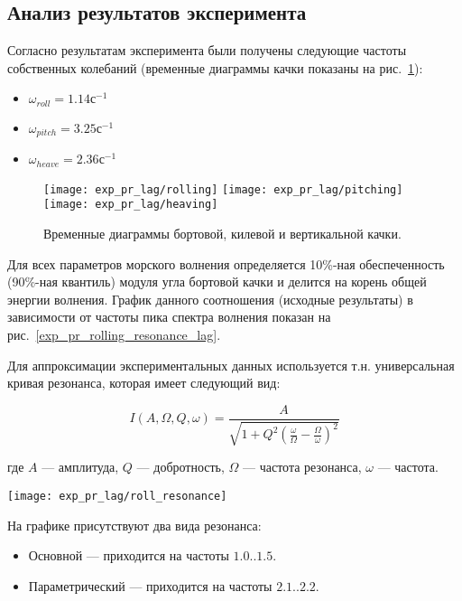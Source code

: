 \subsection{Анализ результатов эксперимента}

Согласно результатам эксперимента были получены следующие частоты собственных колебаний (временные диаграммы качки показаны на рис.~\ref{exp_pr_rolling_lag}):
\begin{itemize}
	\item	$ \omega_{roll} = 1.14 \text{с}^{-1}$
	\item	$ \omega_{pitch} = 3.25 \text{с}^{-1}$
	\item	$ \omega_{heave} = 2.36 \text{с}^{-1}$
\end{itemize}

\begin{figure}[ht]
	\begin{center}
	\texttt{[image: exp\_pr\_lag/rolling]}
	\texttt{[image: exp\_pr\_lag/pitching]}
	\texttt{[image: exp\_pr\_lag/heaving]}
	\end{center}
	\caption{Временные диаграммы бортовой, килевой и вертикальной качки.}
	\label{exp_pr_rolling_lag}
\end{figure}

Для всех параметров морского волнения определяется 10\%-ная обеспеченность (90\%-ная квантиль) модуля угла бортовой качки и делится на корень общей энергии волнения. График данного соотношения (исходные результаты) в зависимости от частоты пика спектра волнения показан на рис.~\ref{exp_pr_rolling_resonance_lag}.

Для аппроксимации экспериментальных данных используется т.н. универсальная кривая резонанса, которая имеет следующий вид:

\begin{equation}
	I(A,\Omega,Q,\omega) = \frac{A}{ \sqrt{ 1 + Q^2 
	\left( \frac{\omega}{\Omega} - \frac{\Omega}{\omega} \right)^2  } }
\end{equation}

где $A$ --- амплитуда, $Q$ --- добротность, $\Omega$ --- частота резонанса, $\omega$ --- частота.

\begin{sidewaysfigure}
	\begin{center}
	\texttt{[image: exp\_pr\_lag/roll\_resonance]}
	\end{center}
	\caption{Основной и параметрический резонанс бортовой качки.}
	\label{exp_pr_rolling_resonance_lag}
\end{sidewaysfigure}

На графике присутствуют два вида резонанса:
\begin{itemize}
	\item	Основной --- приходится на частоты $1.0..1.5$.
	\item	Параметрический --- приходится на частоты $2.1..2.2$.
\end{itemize}

